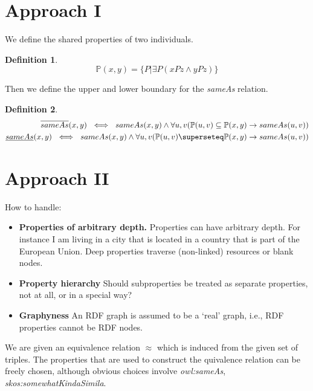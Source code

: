 \documentclass[11pt,a4paper,notitlepage,onecolumn,twoside]{article}
\newtheorem{definition}{Definition}
\begin{document}
\section{Approach I}

We define the shared properties of two individuals.

\begin{definition}
\begin{equation}
\mathbb{P}(x,y) = \{ P \vert \exists P (xPz \land yPz) \}
\end{equation}
\end{definition}

Then we define the upper and lower boundary for the \emph{sameAs} relation.

\begin{definition}
\begin{align}
\overline{sameAs}(x,y) \  \iff \  sameAs(x,y) \land
    \forall u,v (\mathbb{P}(u,v) \subseteq \mathbb{P}(x,y) \rightarrow sameAs(u,v)) \\
\underline{sameAs}(x,y) \  \iff \  sameAs(x,y) \land
    \forall u,v (\mathbb{P}(u,v) \superseteq \mathbb{P}(x,y) \rightarrow sameAs(u,v))
\end{align}
\end{definition}

\section{Approach II}

How to handle:
\begin{itemize}
\item \textbf{Properties of arbitrary depth.} Properties can have arbitrary
      depth. For instance I am living in a city that is located in a country
      that is part of the European Union. Deep properties traverse
      (non-linked) resources or blank nodes.
\item \textbf{Property hierarchy} Should subproperties be treated
      as separate properties, not at all, or in a special way?
\item \textbf{Graphyness} An RDF graph is assumed to be a `real' graph,
      i.e., RDF properties cannot be RDF nodes.
\end{itemize}

We are given an equivalence relation $\approx$ which is induced
from the given set of triples. The properties that are used to construct
the quivalence relation can be freely chosen, although obvious choices
involve \emph{owl:sameAs}, \emph{skos:somewhatKindaSimila}.
\end{document}

